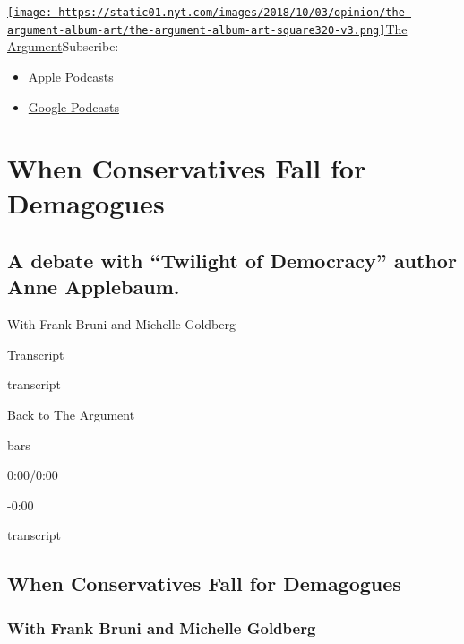 \href{https://www.nytimes.com/column/the-argument}{\texttt{[image: https://static01.nyt.com/images/2018/10/03/opinion/the-argument-album-art/the-argument-album-art-square320-v3.png]}The
Argument}Subscribe:

\begin{itemize}
\tightlist
\item
  \href{https://itunes.apple.com/us/podcast/id1438024613}{Apple
  Podcasts}
\item
  \href{https://www.google.com/podcasts?feed=aHR0cHM6Ly9yc3MuYXJ0MTkuY29tL3RoZS1hcmd1bWVudA\%3D\%3D}{Google
  Podcasts}
\end{itemize}

\hypertarget{when-conservatives-fall-for-demagogues-1}{%
\section{When Conservatives Fall for
Demagogues}\label{when-conservatives-fall-for-demagogues-1}}

\hypertarget{a-debate-with-twilight-of-democracy-author-anne-applebaum-1}{%
\subsection{A debate with ``Twilight of Democracy'' author Anne
Applebaum.}\label{a-debate-with-twilight-of-democracy-author-anne-applebaum-1}}

With Frank Bruni and Michelle Goldberg

Transcript

transcript

Back to The Argument

bars

0:00/0:00

-0:00

transcript

\hypertarget{when-conservatives-fall-for-demagogues-2}{%
\subsection{When Conservatives Fall for
Demagogues}\label{when-conservatives-fall-for-demagogues-2}}

\hypertarget{with-frank-bruni-and-michelle-goldberg-1}{%
\subsubsection{With Frank Bruni and Michelle
Goldberg}\label{with-frank-bruni-and-michelle-goldberg-1}}

